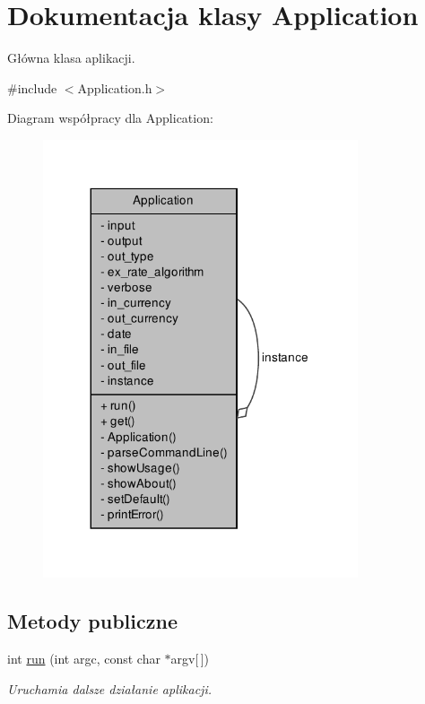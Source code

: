 \hypertarget{class_application}{\section{\-Dokumentacja klasy \-Application}
\label{class_application}
}


\-Główna klasa aplikacji.  




{\ttfamily \#include $<$\-Application.\-h$>$}



\-Diagram współpracy dla \-Application\-:\nopagebreak
\begin{figure}[H]
\begin{center}
\leavevmode
\includegraphics[width=263pt]{class_application__coll__graph}
\end{center}
\end{figure}
\subsection*{\-Metody publiczne}
\begin{DoxyCompactItemize}
\item 
int \hyperlink{class_application_a08f47f2a3acf5691473d3d8bafae0577}{run} (int argc, const char $\ast$argv\mbox{[}$\,$\mbox{]})
\begin{DoxyCompactList}\small\item\em \-Uruchamia dalsze działanie aplikacji. \end{DoxyCompactList}\end{DoxyCompactItemize}
